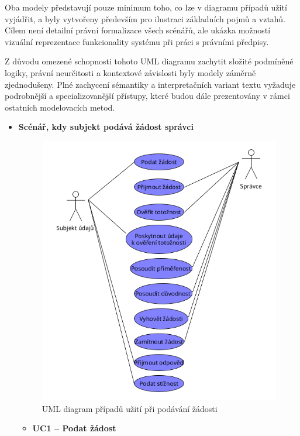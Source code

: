 Oba modely představují pouze minimum toho, co lze v diagramu případů užití vyjádřit, a byly vytvořeny především pro ilustraci základních pojmů a vztahů. Cílem není detailní právní formalizace všech scénářů, ale ukázka možností vizuální reprezentace funkcionality systému při práci s právními předpisy.

Z důvodu omezené schopnosti tohoto UML diagramu zachytit složité podmíněné logiky, právní neurčitosti a kontextové závislosti byly modely záměrně zjednodušeny. Plné zachycení sémantiky a interpretačních variant textu vyžaduje podrobnější a specializovanější přístupy, které budou dále prezentovány v rámci ostatních modelovacích metod.

\begin{itemize}
  \item \textbf{Scénář, kdy subjekt podává žádost správci}
  
  \begin{figure}[H]
    \centering
    \includegraphics[width=\textwidth]{images/UML_usecase_zadost.png}
    \caption{UML diagram případů užití při podávání žádosti}
    \label{fig:uml_usecase_zadost}
  \end{figure}

  \begin{itemize}
    \item \textbf{UC1 – Podat žádost}


\end{itemize}
\end{itemize}

